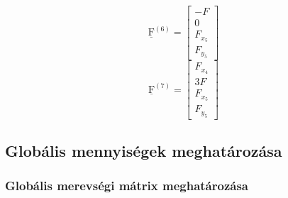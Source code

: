 \documentclass[12pt,a4paper]{article}
\def\vec#1{\underline{\mathrm{#1}}}
\begin{document}
\begin{multicols}{7}
\begin{equation*}
    \end{equation*}
    \columnbreak
    \begin{equation*}
        \vec{F}^{\left(6\right)}=
        \begin{bmatrix}
            -F      \\
            0       \\
            F_{x_5} \\
            F_{y_5}
        \end{bmatrix}
    \end{equation*}
    \columnbreak
    \begin{equation*}
        \vec{F}^{\left(7\right)}=
        \begin{bmatrix}
            F_{x_4} \\
            3 F     \\
            F_{x_5} \\
            F_{y_5}
        \end{bmatrix}
    \end{equation*}
\end{multicols}
\subsection{Globális mennyiségek meghatározása}
\subsubsection{Globális merevségi mátrix meghatározása}
\end{document}
